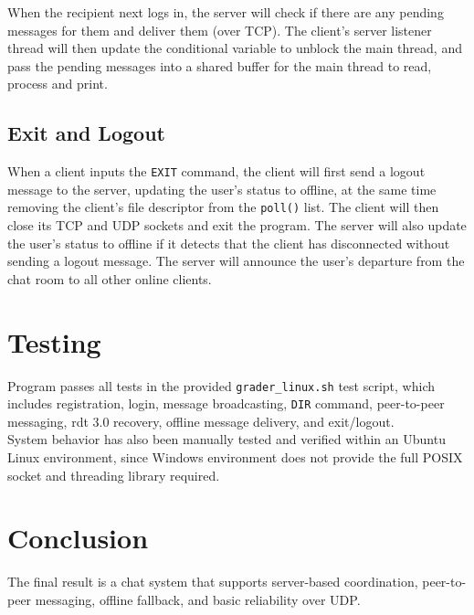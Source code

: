 \documentclass[11pt]{article}
\begin{document}
When the recipient next logs in, 
the server will check if there are any pending messages for them and deliver them (over TCP).
The client's server listener thread will then update the conditional variable to unblock the main thread, 
and pass the pending messages into a shared buffer for the main thread to read, process and print.

\subsection{Exit and Logout}
When a client inputs the \texttt{EXIT} command, 
the client will first send a logout message to the server, updating the user's status to offline, 
at the same time removing the client's file descriptor from the \texttt{poll()} list.
The client will then close its TCP and UDP sockets and exit the program.
The server will also update the user's status to offline if it detects that 
the client has disconnected without sending a logout message. 
The server will announce the user's departure from the chat room to all other online clients.

\section{Testing}
Program passes all tests in the provided \texttt{grader\_linux.sh} test script, 
which includes registration, login, message broadcasting, \texttt{DIR} command, 
peer-to-peer messaging, rdt 3.0 recovery, offline message delivery, and exit/logout. \\

System behavior has also been manually tested and verified within an Ubuntu Linux environment, 
since Windows environment does not provide the full POSIX socket and threading library required.

\section{Conclusion}

The final result is a chat system that supports server-based coordination, 
peer-to-peer messaging, offline fallback, and basic reliability over UDP. 
\end{document}
